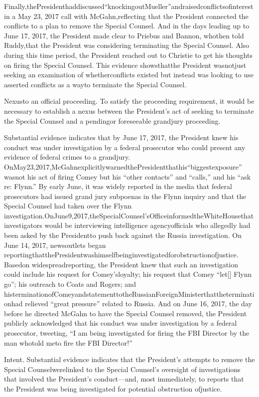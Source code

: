 {Finally,thePresidenthaddiscussed“knockingoutMueller”andraisedconflictsofinterest in a May 23, 2017 call with McGahn,reflecting that the President connected the conflicts to a plan to remove the Special Counsel. And in the days leading up to June 17, 2017, the President made clear to Priebus and Bannon, whothen told Ruddy,that the President was considering terminating the Special Counsel. Also during this time period, the President reached out to Christie to get his thoughts on firing the Special Counsel. This evidence showsthatthe President wasnotjust seeking an examination of whetherconflicts existed but instead was looking to use asserted conflicts as a wayto terminate the Special Counsel.

Nexusto an official proceeding. To satisfy the proceeding requirement, it would be necessary to establish a nexus between the President’s act of seeking to terminate the Special Counsel and a pendingor foreseeable grandjury proceeding.

Substantial evidence indicates that by June 17, 2017, the President knew his conduct was under investigation by a federal prosecutor who could present any evidence of federal crimes to a grandjury. OnMay23,2017,McGahnexplicitlywarnedthePresidentthathis“biggestexposure” wasnot his act of firing Comey but his “other contacts” and “calls,” and his “ask re: Flynn.” By early June, it was widely reported in the media that federal prosecutors had issued grand jury subpoenas in the Flynn inquiry and that the Special Counsel had taken over the Flynn investigation.OnJune9,2017,theSpecialCounsel’sOfficeinformedtheWhiteHousethat investigators would be interviewing intelligence agencyofficials who allegedly had been asked by the Presidentto push back against the Russia investigation. On June 14, 2017, newsoutlets began reportingthatthePresidentwashimselfbeinginvestigatedforobstructionofjustice. Basedon widespreadreporting, the President knew that such an investigation could include his request for Comey’sloyalty; his request that Comey “let[] Flynn go”; his outreach to Coats and Rogers; and histerminationofComeyandstatementtotheRussianForeignMinisterthattheterminationhad relieved “great pressure” related to Russia. And on June 16, 2017, the day before he directed McGahn to have the Special Counsel removed, the President publicly acknowledged that his conduct was under investigation by a federal prosecutor, tweeting, “I am being investigated for firing the FBI Director by the man whotold meto fire the FBI Director!”

Intent. Substantial evidence indicates that the President’s attempts to remove the Special Counselwerelinked to the Special Counsel’s oversight of investigations that involved the President’s conduct—and, most immediately, to reports that the President was being investigated for potential obstruction ofjustice.

}
